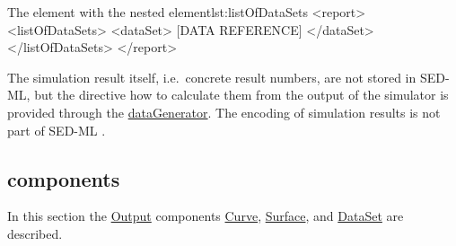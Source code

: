 
\begin{myXmlLst}{The  element with the nested  element}{lst:listOfDataSets}
<report>
	<listOfDataSets>
		<dataSet>
			[DATA REFERENCE]
		</dataSet>
	</listOfDataSets>
</report>
\end{myXmlLst}

The simulation result itself, i.e.\ concrete result numbers, are not stored in SED-ML, but the directive how to calculate them from the output of the simulator is provided through the \hyperref[class:dataGenerator]{dataGenerator}. The encoding of simulation results is not part of SED-ML \currentLV.

\subsection{ components}
In this section the \hyperref[class:output]{Output} components \hyperref[class:curve]{Curve}, \hyperref[class:surface]{Surface}, and \hyperref[class:dataSet]{DataSet} are described.

